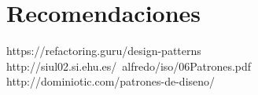 \documentclass[twoside,twocolumn]{article}
\begin{document}
\section{Recomendaciones}\label{sec:7}




https://refactoring.guru/design-patterns
http://siul02.si.ehu.es/~alfredo/iso/06Patrones.pdf
http://dominiotic.com/patrones-de-diseno/
\end{document}
